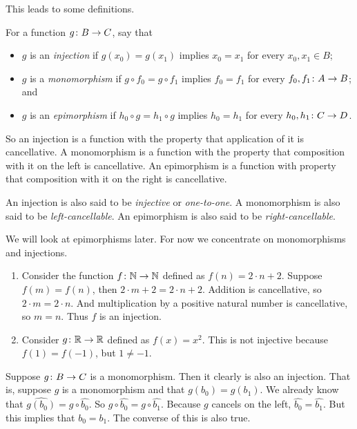 This leads to some definitions.

\begin{defn}
	For a function ${g}\colon{B}\to{C}$, say that
	\begin{itemize}
		\item $g$ is an \emph{injection} if $g(x_0)=g(x_1)$ implies $x_0=x_1$ for every $x_0,x_1\in B$;
		\item $g$ is a \emph{monomorphism} if  $g\circ f_0=g\circ f_1$ implies $f_0=f_1$ for every ${f_0,f_1}\colon{A}\to{B}$; and
		\item $g$ is an \emph{epimorphism} if  $h_0\circ g = h_1\circ g$ implies $h_0=h_1$ for every ${h_0,h_1}\colon{C}\to{D}$.
	\end{itemize}  
\end{defn}

So an injection is a function with the property that application of it is cancellative.
A monomorphism is a function with the property that composition with it on the left is cancellative. 
An epimorphism is a function with property that composition with it on the right is cancellative.

An injection is also said to be \emph{injective} or \emph{one-to-one}.
A monomorphism is also said to be \emph{left-cancellable}. 
An epimorphism is also said to be \emph{right-cancellable}.

We will look at epimorphisms later. For now we concentrate on monomorphisms and injections.

\printbreak
\begin{example}
	\begin{enumerate}
		\item Consider the function ${f}\colon{\mathbb N}\to{\mathbb N}$ defined as $f(n) = 2\cdot n  + 2$.
		Suppose $f(m)=f(n)$, then $2\cdot m + 2=2\cdot n+ 2$. 
		Addition is cancellative, so $2\cdot m=2\cdot n$. 
		And multiplication by a positive natural number is cancellative, so $m=n$.
		Thus $f$ is an injection.
		\item Consider ${g}\colon{\mathbb R}\to{\mathbb R}$ defined as $f(x) = x^2$. 
		This is not injective because $f(1)=f(-1)$, but $1\neq -1$.
	\end{enumerate}
\end{example}

Suppose ${g}\colon{B}\to{C}$ is a monomorphism. 
Then it clearly is also an injection. 
That is, suppose $g$ is a monomorphism and that $g(b_0)=g(b_1)$. 
We already know that $\widehat{g(b_0)} = g\circ \widehat{b_0}$.
So $g\circ \widehat{b_0} = g\circ \widehat{b_1}$.
Because $g$ cancels on the left, $\widehat{b_0} = \widehat{b_1}$.
But this implies that $b_0=b_1$.
The converse of this is also true.

